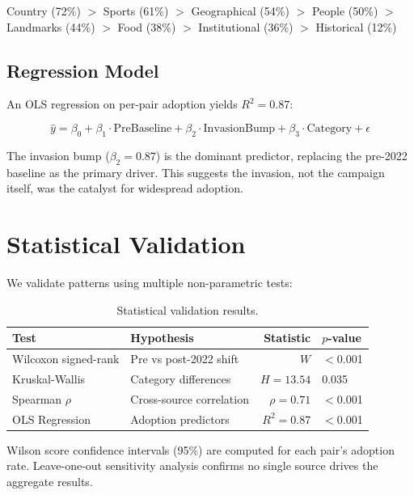 \documentclass{article}
\begin{document}
\begin{center}
Country (72\%) $>$ Sports (61\%) $>$ Geographical (54\%) $>$ People (50\%) $>$ Landmarks (44\%) $>$ Food (38\%) $>$ Institutional (36\%) $>$ Historical (12\%)
\end{center}

\subsection{Regression Model}
\label{sec:regression}

An OLS regression on per-pair adoption yields $R^2 = 0.87$:

\begin{equation}
\hat{y} = \beta_0 + \beta_1 \cdot \text{PreBaseline} + \beta_2 \cdot \text{InvasionBump} + \beta_3 \cdot \text{Category} + \epsilon
\label{eq:regression}
\end{equation}

The invasion bump ($\beta_2 = 0.87$) is the dominant predictor, replacing the pre-2022 baseline as the primary driver. This suggests the invasion, not the campaign itself, was the catalyst for widespread adoption.

\section{Statistical Validation}
\label{sec:stats}

We validate patterns using multiple non-parametric tests:

\begin{table}[t]
\centering
\small
\caption{Statistical validation results.}
\label{tab:stats}
\begin{tabular}{llrl}
\toprule
\textbf{Test} & \textbf{Hypothesis} & \textbf{Statistic} & \textbf{$p$-value} \\
\midrule
Wilcoxon signed-rank & Pre vs post-2022 shift & $W$ & $<$0.001 \\
Kruskal-Wallis & Category differences & $H = 13.54$ & 0.035 \\
Spearman $\rho$ & Cross-source correlation & $\rho = 0.71$ & $<$0.001 \\
OLS Regression & Adoption predictors & $R^2 = 0.87$ & $<$0.001 \\
\bottomrule
\end{tabular}
\end{table}

Wilson score confidence intervals (95\%) are computed for each pair's adoption rate. Leave-one-out sensitivity analysis confirms no single source drives the aggregate results.
\end{document}
